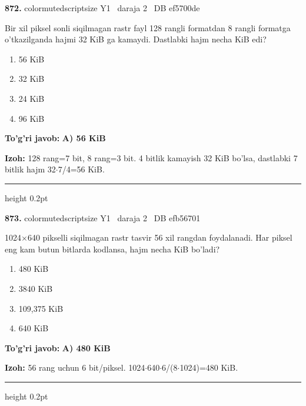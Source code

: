\documentclass[10pt,a4paper,oneside]{article}
\begin{document}
\noindent\textbf{\color{ink}872.}  {color{muted}scriptsize Y1 \textbullet\ daraja 2 \textbullet\ DB ef5700de}
\par
Bir xil piksel sonli siqilmagan rastr fayl 128 rangli formatdan 8 rangli formatga o'tkazilganda hajmi 32 KiB ga kamaydi. Dastlabki hajm necha KiB edi?
\begin{enumerate}[label=\Alph*),leftmargin=9mm]
\item 56 KiB
\item 32 KiB
\item 24 KiB
\item 96 KiB
\end{enumerate}
\begin{tcolorbox}[enhanced,breakable,colback=teal!4,colframe=teal!50!black,boxrule=0.5pt,arc=1.1mm,left=3mm,right=3mm,top=1.7mm,bottom=1.7mm,before skip=2mm,after skip=2mm]
\textbf{\color{teal}To'g'ri javob:} \textbf{A) 56 KiB}
\par\smallskip
\textbf{Izoh:} 128 rang=7 bit, 8 rang=3 bit. 4 bitlik kamayish 32 KiB bo'lsa, dastlabki 7 bitlik hajm 32\ensuremath{\cdot}7/4=56 KiB.
\end{tcolorbox}
\vspace{2mm}\hrule height 0.2pt \vspace{3mm}

\noindent\textbf{\color{ink}873.}  {color{muted}scriptsize Y1 \textbullet\ daraja 2 \textbullet\ DB efb56701}
\par
1024\ensuremath{\times}640 pikselli siqilmagan rastr tasvir 56 xil rangdan foydalanadi. Har piksel eng kam butun bitlarda kodlansa, hajm necha KiB bo'ladi?
\begin{enumerate}[label=\Alph*),leftmargin=9mm]
\item 480 KiB
\item 3840 KiB
\item 109,375 KiB
\item 640 KiB
\end{enumerate}
\begin{tcolorbox}[enhanced,breakable,colback=teal!4,colframe=teal!50!black,boxrule=0.5pt,arc=1.1mm,left=3mm,right=3mm,top=1.7mm,bottom=1.7mm,before skip=2mm,after skip=2mm]
\textbf{\color{teal}To'g'ri javob:} \textbf{A) 480 KiB}
\par\smallskip
\textbf{Izoh:} 56 rang uchun 6 bit/piksel. 1024\ensuremath{\cdot}640\ensuremath{\cdot}6/(8\ensuremath{\cdot}1024)=480 KiB.
\end{tcolorbox}
\vspace{2mm}\hrule height 0.2pt \vspace{3mm}
\end{document}
